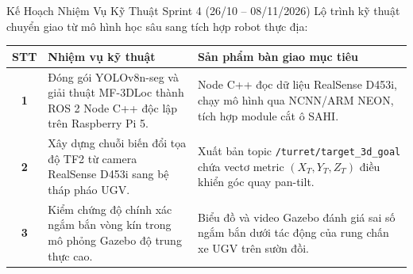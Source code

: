 \documentclass[aspectratio=169, 10pt]{beamer}
\begin{document}
\begin{frame}{Kế Hoạch Nhiệm Vụ Kỹ Thuật Sprint 4 (26/10 -- 08/11/2026)}
\small
Lộ trình kỹ thuật chuyển giao từ mô hình học sâu sang tích hợp robot thực địa:
\vspace{0.15cm}
\begin{table}[htbp]
\centering
\scriptsize
\renewcommand{\arraystretch}{1.1}
\begin{tabularx}{\textwidth}{c p{5.5cm} X}
\toprule
\textbf{STT} & \textbf{Nhiệm vụ kỹ thuật} & \textbf{Sản phẩm bàn giao mục tiêu} \\
\midrule
\textbf{1} & Đóng gói YOLOv8n-seg và giải thuật MF-3DLoc thành ROS 2 Node C++ độc lập trên Raspberry Pi 5. & Node C++ đọc dữ liệu RealSense D453i, chạy mô hình qua NCNN/ARM NEON, tích hợp module cắt ô SAHI. \\
\textbf{2} & Xây dựng chuỗi biến đổi tọa độ TF2 từ camera RealSense D453i sang bệ tháp pháo UGV. & Xuất bản topic \texttt{/turret/target\_3d\_goal} chứa vectơ metric $(X_T, Y_T, Z_T)$ điều khiển góc quay pan-tilt. \\
\textbf{3} & Kiểm chứng độ chính xác ngắm bắn vòng kín trong mô phỏng Gazebo độ trung thực cao. & Biểu đồ và video Gazebo đánh giá sai số ngắm bắn dưới tác động của rung chấn xe UGV trên sườn đồi. \\
\bottomrule
\end{tabularx}
\end{table}
\end{frame}
\end{document}
